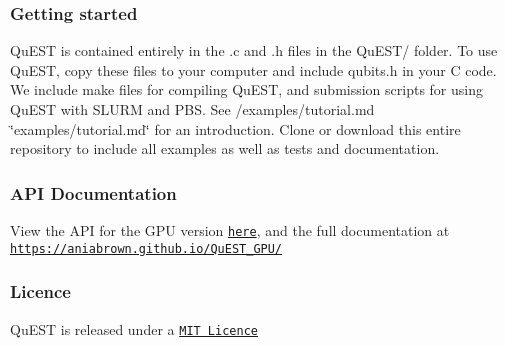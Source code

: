 \subsubsection*{Getting started}

Qu\+E\+ST is contained entirely in the {\ttfamily .c} and {\ttfamily .h} files in the {\ttfamily Qu\+E\+S\+T/} folder. To use Qu\+E\+ST, copy these files to your computer and include {\ttfamily qubits.\+h} in your C code. We include make files for compiling Qu\+E\+ST, and submission scripts for using Qu\+E\+ST with S\+L\+U\+RM and P\+BS. See /examples/tutorial.md \char`\"{}examples/tutorial.\+md\char`\"{} for an introduction. Clone or download this entire repository to include all examples as well as tests and documentation.

\subsubsection*{A\+PI Documentation}

View the A\+PI for the G\+PU version \href{https://aniabrown.github.io/QuEST_GPU/qubits_8h.html}{\tt here}, and the full documentation at \href{https://aniabrown.github.io/QuEST_GPU/}{\tt https\+://aniabrown.\+github.\+io/\+Qu\+E\+S\+T\+\_\+\+G\+P\+U/}

\subsubsection*{Licence}

Qu\+E\+ST is released under a \href{LICENCE.txt}{\tt M\+IT Licence} 